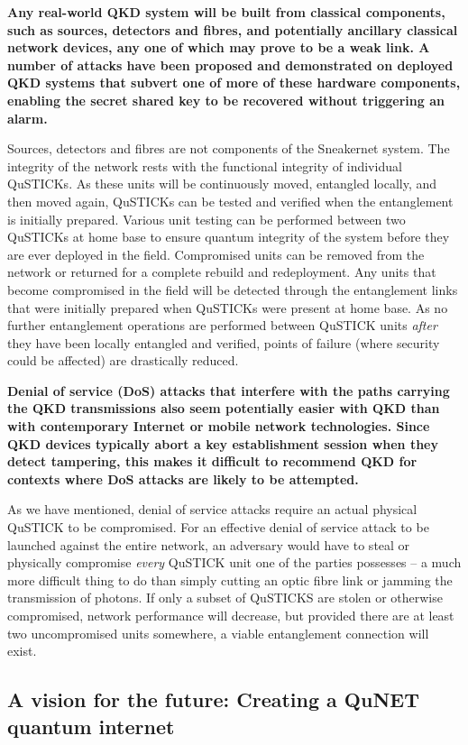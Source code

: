\documentclass[twocolumn, aps, rmp, amsmath, amssymb, nofootinbib, superscriptaddress, longbibliography, floatfix, table-of-contents, eqsecnum]{revtex4-2}
\begin{document}
\textbf{Any real-world QKD system will be built from classical components, such as sources, detectors and fibres, and potentially ancillary classical network devices, any one of which may prove to be a weak link. A number of attacks have been proposed and demonstrated on deployed QKD systems that subvert one of more of these hardware components, enabling the secret shared key to be recovered without triggering an alarm.}

Sources, detectors and fibres are not components of the Sneakernet system. The integrity of the network rests with the functional integrity of individual QuSTICKs. As these units will be continuously moved, entangled locally, and then moved again, QuSTICKs can be tested and verified when the entanglement is initially prepared. Various unit testing can be performed between two QuSTICKs at home base to ensure quantum integrity of the system before they are ever deployed in the field. Compromised units can be removed from the network or returned for a complete rebuild and redeployment. Any units that become compromised in the field will be detected through the entanglement links that were initially prepared when QuSTICKs were present at home base. As no further entanglement operations are performed between QuSTICK units \textit{after} they have been locally entangled and verified, points of failure (where security could be affected) are drastically reduced. 

\textbf{Denial of service (DoS) attacks that interfere with the paths carrying the QKD transmissions also seem potentially easier with QKD than with contemporary Internet or mobile network technologies. Since QKD devices typically abort a key establishment session when they detect tampering, this makes it difficult to recommend QKD for contexts where DoS attacks are likely to be attempted.}

As we have mentioned, denial of service attacks require an actual physical QuSTICK to be compromised. For an effective denial of service attack to be launched against the entire network, an adversary would have to steal or physically compromise \textit{every} QuSTICK unit one of the parties possesses -- a much more difficult thing to do than simply cutting an optic fibre link or jamming the transmission of photons. If only a subset of QuSTICKS are stolen or otherwise compromised, network performance will decrease, but provided there are at least two uncompromised units somewhere, a viable entanglement connection will exist. 

\subsection{A vision for the future: Creating a QuNET quantum internet}
\end{document}

